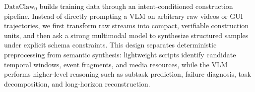 












$\text{DataClaw}_0$ builds training data through an intent-conditioned construction pipeline. Instead of directly prompting a VLM on arbitrary raw videos or GUI trajectories, we first transform raw streams into compact, verifiable construction units, and then ask a strong multimodal model to synthesize structured samples under explicit schema constraints. This design separates deterministic preprocessing from semantic synthesis: lightweight scripts identify candidate temporal windows, event fragments, and media resources, while the VLM performs higher-level reasoning such as subtask prediction, failure diagnosis, task decomposition, and long-horizon reconstruction.

